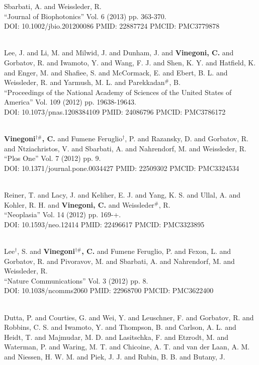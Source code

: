 Sbarbati, A. and Weissleder, R. \\ ``Journal of Biophotonics'' Vol. 6 (2013) pp. 363-370. \\ DOI: 10.1002/jbio.201200086 PMID: 22887724 PMCID: PMC3779878\item {} \\ Lee, J. and Li, M. and Milwid, J. and Dunham, J. and {\bf Vinegoni, C.} and Gorbatov, R. and Iwamoto, Y. and Wang, F. J. and Shen, K. Y. and Hatfield, K. and Enger, M. and Shafiee, S. and McCormack, E. and Ebert, B. L. and Weissleder, R. and Yarmush, M. L. and Parekkadan$^\#$, B. \\ ``Proceedings of the National Academy of Sciences of the United States of America'' Vol. 109 (2012) pp. 19638-19643. \\ DOI: 10.1073/pnas.1208384109 PMID: 24086796 PMCID: PMC3786172\item {} \\ {\bf Vinegoni$^{\dag \#}$, C.} and Fumene Feruglio$^\dag$, P. and Razansky, D. and Gorbatov, R. and Ntziachristos, V. and Sbarbati, A. and Nahrendorf, M. and Weissleder, R. \\ ``Plos One'' Vol. 7 (2012) pp. 9. \\ DOI: 10.1371/journal.pone.0034427 PMID: 22509302 PMCID: PMC3324534\item {} \\ Reiner, T. and Lacy, J. and Keliher, E. J. and Yang, K. S. and Ullal, A. and Kohler, R. H. and {\bf Vinegoni, C.} and Weissleder$^\#$, R. \\ ``Neoplasia'' Vol. 14 (2012) pp. 169-+. \\ DOI: 10.1593/neo.12414 PMID: 22496617 PMCID: PMC3323895\item {} \\ Lee$^\dag$, S. and {\bf Vinegoni$^{\dag \#}$, C.} and Fumene Feruglio, P. and Fexon, L. and Gorbatov, R. and Pivoravov, M. and Sbarbati, A. and Nahrendorf, M. and Weissleder, R. \\ ``Nature Communications'' Vol. 3 (2012) pp. 8. \\ DOI: 10.1038/ncomms2060 PMID: 22968700 PMCID: PMC3622400\item {} \\ Dutta, P. and Courties, G. and Wei, Y. and Leuschner, F. and Gorbatov, R. and Robbins, C. S. and Iwamoto, Y. and Thompson, B. and Carlson, A. L. and Heidt, T. and Majmudar, M. D. and Lasitschka, F. and Etzrodt, M. and Waterman, P. and Waring, M. T. and Chicoine, A. T. and van der Laan, A. M. and Niessen, H. W. M. and Piek, J. J. and Rubin, B. B. and Butany, J. 